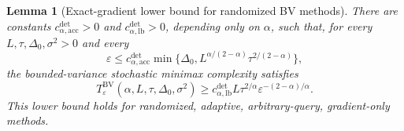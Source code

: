 \documentclass[11pt]{article}
\newtheorem{lemma}[theorem]{Lemma}
\begin{document}
\begin{lemma}[Exact-gradient lower bound for randomized BV methods]
\label{lem:bv-deterministic-term}
There are constants $c_{\alpha,\mathrm{acc}}^{\mathrm{det}}>0$ and
$c_{\alpha,\mathrm{lb}}^{\mathrm{det}}>0$, depending only on $\alpha$, such that, for every
$L,\tau,\Delta_0,\sigma^2>0$ and every
\[
\varepsilon\le c_{\alpha,\mathrm{acc}}^{\mathrm{det}}
\min\{\Delta_0,L^{\alpha/(2-\alpha)}\tau^{2/(2-\alpha)}\},
\]
the bounded-variance stochastic minimax complexity satisfies
\begin{equation}
\label{eq:bv-deterministic-term}
T_\varepsilon^{\mathrm{BV}}(\alpha,L,\tau,\Delta_0,\sigma^2)
\ge
c_{\alpha,\mathrm{lb}}^{\mathrm{det}}
L\tau^{2/\alpha}\varepsilon^{-(2-\alpha)/\alpha}.
\end{equation}
This lower bound holds for randomized, adaptive, arbitrary-query, gradient-only methods.
\end{lemma}
\end{document}
